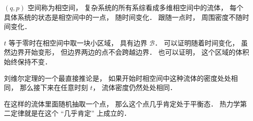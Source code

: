 

\begin{issues}
\issueDraft
\end{issues}

$(q, p)$ 空间称为相空间， 复杂系统的所有系综看成多维相空间中的流体， 每个具体系统的状态是相空间中的一点， 随时间变化． 跟随一点时， 周围密度不随时间变化．

$t$ 等于零时在相空间中取一块小区域， 具有边界 $\mathcal B$． 可以证明随着时间变化， 虽然边界开始变形， 但边界两边的点不会跨越边界． 也可以证明， 这个区域的体积始终保持不变．

刘维尔定理的一个最直接推论是， 如果开始时相空间中这种流体的密度处处相同， 那么接下来在任意时刻 $t$， 流体密度仍然处处相同．

在这样的流体里面随机抽取一个点， 那么这个点几乎肯定处于平衡态． 热力学第二定律就是在这个 “几乎肯定” 上成立的．
